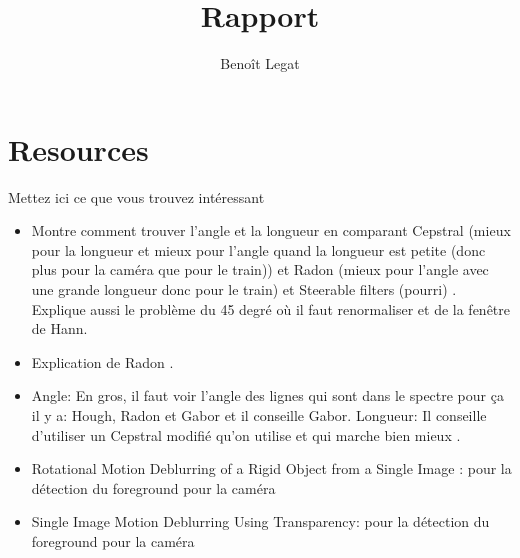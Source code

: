 \documentclass{article}
\title{Rapport}
\author{Benoît Legat}
\begin{document}


\section{Resources}
Mettez ici ce que vous trouvez intéressant
\begin{itemize}
  \item Montre comment trouver l'angle et la longueur en comparant Cepstral (mieux pour la longueur et mieux pour l'angle quand la longueur est petite (donc plus pour la caméra que pour le train)) et Radon (mieux pour l'angle avec une grande longueur donc pour le train) et Steerable filters (pourri) \cite{krahmer2006blind}.
    Explique aussi le problème du 45 degré où il faut renormaliser et de la fenêtre de Hann.
  \item Explication de Radon \cite{oliveira2007blind}.
  \item Angle: En gros, il faut voir l'angle des lignes qui sont dans le spectre pour ça il y a: Hough, Radon et Gabor et il conseille Gabor.
    Longueur: Il conseille d'utiliser un Cepstral modifié qu'on utilise et qui marche bien mieux \cite{Deshpande2014606}.
   \item  Rotational Motion Deblurring of a Rigid Object from a Single Image : pour la détection du foreground pour la caméra
   \item  Single Image Motion Deblurring Using Transparency: pour la détection du foreground pour la caméra
\end{itemize}
\end{document}
